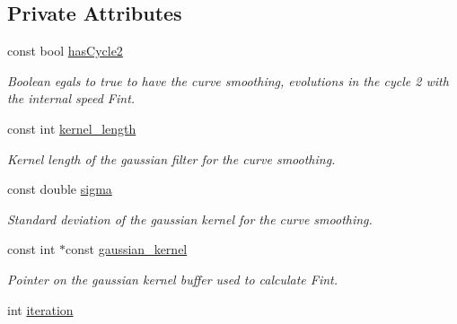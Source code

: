 \subsection*{Private Attributes}
\begin{DoxyCompactItemize}
\item 
\hypertarget{classofeli_1_1_active_contour_aa763ff1bed211faa444013cbd5de0be3}{const bool \hyperlink{classofeli_1_1_active_contour_aa763ff1bed211faa444013cbd5de0be3}{has\-Cycle2}}\label{classofeli_1_1_active_contour_aa763ff1bed211faa444013cbd5de0be3}

\begin{DoxyCompactList}\small\item\em Boolean egals to {\ttfamily true} to have the curve smoothing, evolutions in the cycle 2 with the internal speed Fint. \end{DoxyCompactList}\item 
\hypertarget{classofeli_1_1_active_contour_a2b32161d0a9ac64a4e4f4c242fabe27c}{const int \hyperlink{classofeli_1_1_active_contour_a2b32161d0a9ac64a4e4f4c242fabe27c}{kernel\-\_\-length}}\label{classofeli_1_1_active_contour_a2b32161d0a9ac64a4e4f4c242fabe27c}

\begin{DoxyCompactList}\small\item\em Kernel length of the gaussian filter for the curve smoothing. \end{DoxyCompactList}\item 
\hypertarget{classofeli_1_1_active_contour_a66303b7f6b88270133462feb303b039a}{const double \hyperlink{classofeli_1_1_active_contour_a66303b7f6b88270133462feb303b039a}{sigma}}\label{classofeli_1_1_active_contour_a66303b7f6b88270133462feb303b039a}

\begin{DoxyCompactList}\small\item\em Standard deviation of the gaussian kernel for the curve smoothing. \end{DoxyCompactList}\item 
\hypertarget{classofeli_1_1_active_contour_a0f8558877cf436d932838173ba5b8061}{const int $\ast$const \hyperlink{classofeli_1_1_active_contour_a0f8558877cf436d932838173ba5b8061}{gaussian\-\_\-kernel}}\label{classofeli_1_1_active_contour_a0f8558877cf436d932838173ba5b8061}

\begin{DoxyCompactList}\small\item\em Pointer on the gaussian kernel buffer used to calculate Fint. \end{DoxyCompactList}\item 
\hypertarget{classofeli_1_1_active_contour_a8723eee8bd5a69dc7c8d7120c642a393}{int \hyperlink{classofeli_1_1_active_contour_a8723eee8bd5a69dc7c8d7120c642a393}{iteration}}\label{classofeli_1_1_active_contour_a8723eee8bd5a69dc7c8d7120c642a393}


\end{DoxyCompactItemize}

